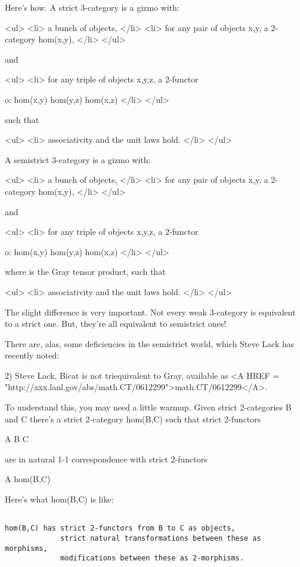 Here's how.  A strict 3-category is a gizmo with:

<ul>
<li>
a bunch of objects,
</li>
<li>
for any pair of objects x,y, a 2-category hom(x,y), 
</li>
</ul>

and

<ul>
<li>
for any triple of objects x,y,z, a 2-functor 

o: hom(x,y) \times  hom(y,z) \to  hom(x,z)
</li>
</ul>

such that

<ul>
<li>
associativity and the unit laws hold.
</li>
</ul>

A semistrict 3-category is a gizmo with:

<ul>
<li>
a bunch of objects,
</li>
<li>
for any pair of objects x,y, a 2-category hom(x,y), 
</li>
</ul>

and

<ul>
<li>
for any triple of objects x,y,z, a 2-functor 

o: hom(x,y) \otimes  hom(y,z) \to  hom(x,z)
</li>
</ul>

where \otimes  is the Gray tensor product, such that

<ul>
<li>
associativity and the unit laws hold.
</li>
</ul>

The slight difference is very important.  Not every weak 3-category
is equivalent to a strict one.  But, they're all equivalent to 
semistrict ones!   

There are, alas, some deficiencies in the semistrict world, which
Steve Lack has recently noted:

2) Steve Lack, Bicat is not triequivalent to Gray, available as <A
HREF = "http://xxx.lanl.gov/abs/math.CT/0612299">math.CT/0612299</A>.

To understand this, you may need a little warmup.  Given strict 
2-categories B and C there's a strict 2-category hom(B,C) such that 
strict 2-functors

A \times  B \to  C

are in natural 1-1 correspondence with strict 2-functors

A \to  hom(B,C)

Here's what hom(B,C) is like:


\begin{verbatim}

hom(B,C) has strict 2-functors from B to C as objects,
             strict natural transformations between these as morphisms,
             modifications between these as 2-morphisms.
\end{verbatim}
    
